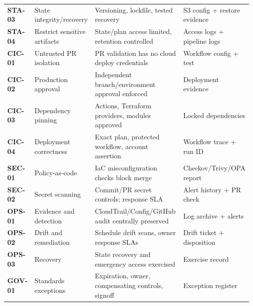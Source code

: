 \documentclass[10pt,letterpaper]{article}
\newcommand{\ctrl}[1]{\textbf{#1}}
\begin{document}
\begin{longtable}{@{}>{\raggedright\arraybackslash}p{13mm}>{\raggedright\arraybackslash}p{39mm}>{\raggedright\arraybackslash}p{64mm}>{\raggedright\arraybackslash}p{34mm}@{}}
\ctrl{STA-03} & State integrity/recovery & Versioning, lockfile, tested recovery & S3 config + restore evidence\\
\ctrl{STA-04} & Restrict sensitive artifacts & State/plan access limited, retention controlled & Access logs + pipeline logs\\
\ctrl{CIC-01} & Untrusted PR isolation & PR validation has no cloud deploy credentials & Workflow config + test\\
\ctrl{CIC-02} & Production approval & Independent branch/environment approval enforced & Deployment evidence\\
\ctrl{CIC-03} & Dependency pinning & Actions, Terraform providers, modules approved & Locked dependencies\\
\ctrl{CIC-04} & Deployment correctness & Exact plan, protected workflow, account assertion & Workflow trace + run ID\\
\ctrl{SEC-01} & Policy-as-code & IaC misconfiguration checks block merge & Checkov/Trivy/OPA report\\
\ctrl{SEC-02} & Secret scanning & Commit/PR secret controls; response SLA & Alert history + PR check\\
\ctrl{OPS-01} & Evidence and detection & CloudTrail/Config/GitHub audit centrally preserved & Log archive + alerts\\
\ctrl{OPS-02} & Drift and remediation & Schedule drift scans, owner response SLAs & Drift ticket + disposition\\
\ctrl{OPS-03} & Recovery & State recovery and emergency access exercised & Exercise record\\
\ctrl{GOV-01} & Standards exceptions & Expiration, owner, compensating controls, signoff & Exception register\\\bottomrule
\end{longtable}
\normalsize
\end{document}
